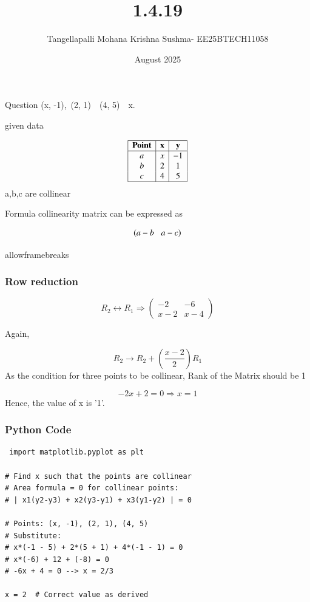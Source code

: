 \documentclass{beamer}
\title %
{1.4.19}
\date{August  2025}
\author %
{Tangellapalli Mohana Krishna Sushma- EE25BTECH11058}
\begin{document}
\frame{\titlepage}
\begin{frame}{Question}
  (x, -1),\ (2, 1)\ \ (4, 5)\ \ x.
\\

\end{frame}
 
\begin{frame}{given data}
 

\[
\begin{array}{|c|c|c|c|}
\hline
\textbf{Point} & \textbf{x} & \textbf{y} \\
\hline
a & x & -1 \\
b & 2 & 1 \\
c & 4 & 5 \\
\hline
\end{array}
\]
a,b,c are collinear
   
\end{frame}

\begin{frame}{Formula}
collinearity matrix can be expressed as 
  
\begin{align*}
  \left(a-b\;\;\;a-c\right)
 \end{align*}
\end{frame}
 


 \begin{frame}{allowframebreaks}
\frametitle{Row reduction}

\[
R_2 \leftrightarrow R_1
\Rightarrow
\begin{pmatrix}
-2 & -6 \\
x - 2 & x - 4
\end{pmatrix}
\]

Again,

\[
R_2 \rightarrow R_2 + \left(\frac{x - 2}{2}\right) R_1
\]
As the condition for three points to be collinear, Rank of the Matrix should be 1

\[
-2x + 2 = 0
\Rightarrow x = 1
\]
Hence, the value of x  is '1'.

\end{frame}

 

\begin{frame}[fragile]
    \frametitle{Python Code}
    \begin{lstlisting}
 import matplotlib.pyplot as plt

# Find x such that the points are collinear
# Area formula = 0 for collinear points:
# | x1(y2-y3) + x2(y3-y1) + x3(y1-y2) | = 0

# Points: (x, -1), (2, 1), (4, 5)
# Substitute:
# x*(-1 - 5) + 2*(5 + 1) + 4*(-1 - 1) = 0
# x*(-6) + 12 + (-8) = 0
# -6x + 4 = 0 --> x = 2/3

x = 2  # Correct value as derived
\end{lstlisting}
\end{frame}
\end{document}
